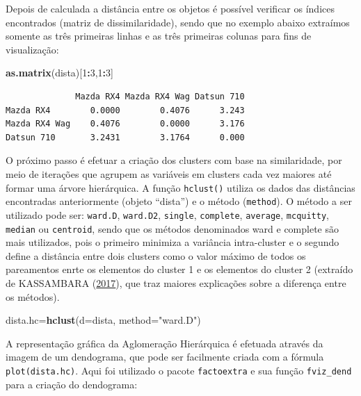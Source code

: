 \documentclass[12pt,brazil,oneside]{book}
\newenvironment{Shaded}{\begin{snugshade}}{\end{snugshade}}
\newcommand{\DataTypeTok}[1]{\textcolor[rgb]{0.13,0.29,0.53}{#1}}
\newcommand{\DecValTok}[1]{\textcolor[rgb]{0.00,0.00,0.81}{#1}}
\newcommand{\KeywordTok}[1]{\textcolor[rgb]{0.13,0.29,0.53}{\textbf{#1}}}
\newcommand{\NormalTok}[1]{#1}
\newcommand{\OperatorTok}[1]{\textcolor[rgb]{0.81,0.36,0.00}{\textbf{#1}}}
\newcommand{\StringTok}[1]{\textcolor[rgb]{0.31,0.60,0.02}{#1}}
\begin{document}
Depois de calculada a distância entre os objetos é possível verificar os índices encontrados (matriz de dissimilaridade), sendo que no exemplo abaixo extraímos somente as três primeiras linhas e as três primeiras colunas para fins de visualização:

\begin{Shaded}
\begin{Highlighting}[]
\KeywordTok{as.matrix}\NormalTok{(dista)[}\DecValTok{1}\OperatorTok{:}\DecValTok{3}\NormalTok{,}\DecValTok{1}\OperatorTok{:}\DecValTok{3}\NormalTok{]}
\end{Highlighting}
\end{Shaded}

\begin{verbatim}
              Mazda RX4 Mazda RX4 Wag Datsun 710
Mazda RX4        0.0000        0.4076      3.243
Mazda RX4 Wag    0.4076        0.0000      3.176
Datsun 710       3.2431        3.1764      0.000
\end{verbatim}

O próximo passo é efetuar a criação dos clusters com base na similaridade, por meio de iterações que agrupem as variáveis em clusters cada vez maiores até formar uma árvore hierárquica. A função \texttt{hclust()} utiliza os dados das distâncias encontradas anteriormente (objeto ``dista'') e o método (\texttt{method}). O método a ser utilizado pode ser: \texttt{ward.D}, \texttt{ward.D2}, \texttt{single}, \texttt{complete}, \texttt{average}, \texttt{mcquitty}, \texttt{median} ou \texttt{centroid}, sendo que os métodos denominados ward e complete são mais utilizados, pois o primeiro minimiza a variância intra-cluster e o segundo define a distância entre dois clusters como o valor máximo de todos os pareamentos enrte os elementos do cluster 1 e os elementos do cluster 2 (extraído de KASSAMBARA (\protect\hyperlink{ref-Kassambara2017}{2017}), que traz maiores explicações sobre a diferença entre os métodos).

\begin{Shaded}
\begin{Highlighting}[]
\NormalTok{dista.hc=}\KeywordTok{hclust}\NormalTok{(}\DataTypeTok{d=}\NormalTok{dista, }\DataTypeTok{method=}\StringTok{"ward.D"}\NormalTok{)}
\end{Highlighting}
\end{Shaded}

A representação gráfica da Aglomeração Hierárquica é efetuada através da imagem de um dendograma, que pode ser facilmente criada com a fórmula \texttt{plot(dista.hc)}. Aqui foi utilizado o pacote \texttt{factoextra} e sua função \texttt{fviz\_dend} para a criação do dendograma:
\end{document}
